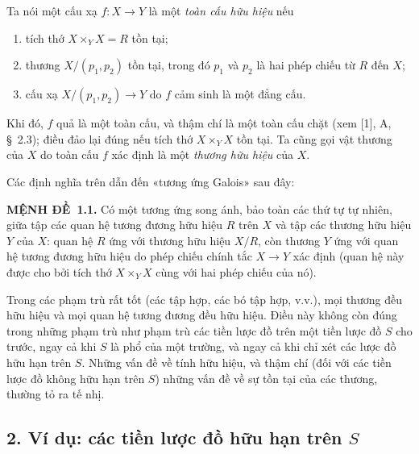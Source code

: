 \documentclass[11pt,twoside,openany]{book}
\numberwithin{equation}{section}
\newcommand{\src}[1]{%
  \phantomsection\hypertarget{src:\fgasourceid:#1}{}%
  \marginpar{\raggedleft\footnotesize\sffamily #1}%
}
\newcommand{\fgasourceid}{unset}
\newcommand{\result}[2]{\par\medskip\noindent\textbf{#1\if\relax\detokenize{#2}\relax\else\ #2\fi.}\quad}
\begin{document}
Ta nói một cấu xạ $f:X\longrightarrow Y$ là một \emph{toàn cấu hữu hiệu}
nếu
\begin{enumerate}
  \item[(i)] tích thớ $X\times_Y X=R$ tồn tại;
  \item[(ii)] thương $X/(p_1,p_2)$ tồn tại, trong đó $p_1$ và $p_2$ là hai phép
  chiếu từ $R$ đến $X$;
  \item[(iii)] cấu xạ $X/(p_1,p_2)\longrightarrow Y$ do $f$ cảm sinh là một
  đẳng cấu.
\end{enumerate}
Khi đó, $f$ quả là một toàn cấu, và thậm chí là một toàn cấu chặt (xem [1],
A, \S~2.3); điều đảo lại đúng nếu tích thớ $X\times_Y X$ tồn tại. Ta cũng
gọi vật thương của $X$ do toàn cấu $f$ xác định là một \emph{thương hữu hiệu}
của $X$.

Các định nghĩa trên dẫn đến «tương ứng Galois» sau đây:

\src{102}
\result{MỆNH ĐỀ}{1.1} Có một tương ứng song ánh, bảo toàn các thứ tự tự
nhiên, giữa tập các quan hệ tương đương hữu hiệu $R$ trên $X$ và tập các
thương hữu hiệu $Y$ của $X$: quan hệ $R$ ứng với thương hữu hiệu $X/R$, còn
thương $Y$ ứng với quan hệ tương đương hữu hiệu do phép chiếu chính tắc
$X\longrightarrow Y$ xác định (quan hệ này được cho bởi tích thớ $X\times_Y X$
cùng với hai phép chiếu của nó).

Trong các phạm trù rất tốt (các tập hợp, các bó tập hợp, v.v.), mọi thương đều
hữu hiệu và mọi quan hệ tương đương đều hữu hiệu. Điều này không còn đúng
trong những phạm trù như phạm trù các tiền lược đồ trên một tiền lược đồ $S$
cho trước, ngay cả khi $S$ là phổ của một trường, và ngay cả khi chỉ xét các
lược đồ hữu hạn trên $S$. Những vấn đề về tính hữu hiệu, và thậm chí (đối với
các tiền lược đồ không hữu hạn trên $S$) những vấn đề về sự tồn tại của các
thương, thường tỏ ra tế nhị.

\subsection*{2. Ví dụ: các tiền lược đồ hữu hạn trên $S$}
\end{document}
